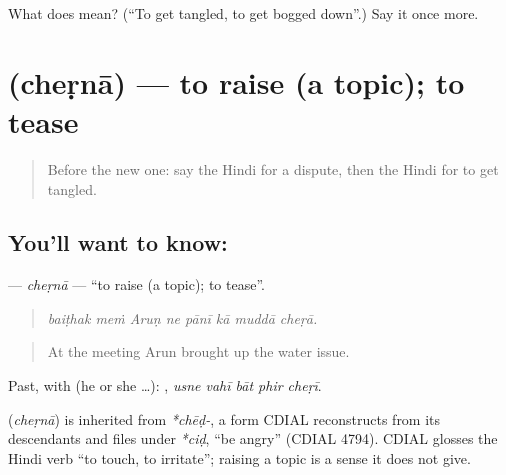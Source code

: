 \begin{tcolorbox}[breakable,colback=teal!4,colframe=teal!35!black,title={Before you move on}]
What does  mean? (\textquotedblleft{}To get tangled, to get bogged down\textquotedblright{}.) Say it once more.
\end{tcolorbox}
\section[\texorpdfstring{\hi{छेड़ना} (cheṛnā)}{छेड़ना (cheṛnā)}]{ (cheṛnā) — to raise (a topic); to tease}

\label{lesson:HI-C359-cherna}



\begin{quote}
Before the new one: say the Hindi for a dispute, then the Hindi for to get tangled.
\end{quote}

\subsection*{You'll want to know: }
\textbf{} — \emph{cheṛnā} — \textquotedblleft{}to raise (a topic); to tease\textquotedblright{}.

\begin{quote}
       
\end{quote}

\begin{quote}
\emph{baiṭhak meṁ Aruṇ ne pānī kā muddā cheṛā.}
\end{quote}

\begin{quote}
At the meeting Arun brought up the water issue.
\end{quote}

Past, with  (he or she …):     , \emph{usne vahī bāt phir cheṛī}.

\begin{cousinweb}
\textbf{} (\emph{cheṛnā}) is inherited from \emph{*chēḍ-}, a form CDIAL reconstructs from its descendants and files under \emph{*ciḍ}, \textquotedblleft{}be angry\textquotedblright{} (CDIAL 4794). CDIAL glosses the Hindi verb \textquotedblleft{}to touch, to irritate\textquotedblright{}; raising a topic is a sense it does not give.
\end{cousinweb}

